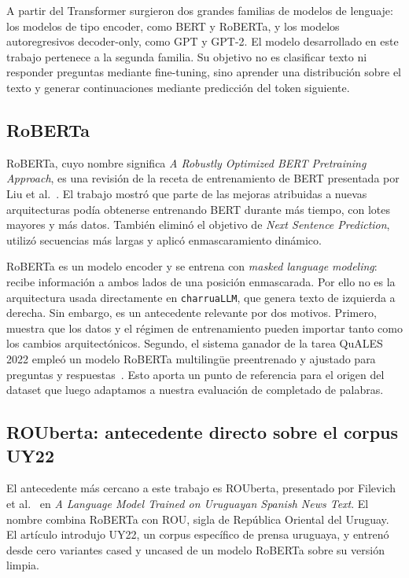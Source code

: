 \documentclass[11pt,a4paper]{article}
\newcommand{\charrua}{\texttt{charruaLLM}}
\begin{document}
A partir del Transformer surgieron dos grandes familias de modelos de lenguaje:
los modelos de tipo encoder, como BERT y RoBERTa, y los modelos autoregresivos
decoder-only, como GPT y GPT-2. El modelo desarrollado en este trabajo pertenece
a la segunda familia. Su objetivo no es clasificar texto ni responder preguntas
mediante fine-tuning, sino aprender una distribución sobre el texto y generar
continuaciones mediante predicción del token siguiente.


\subsection{RoBERTa}

RoBERTa, cuyo nombre significa \emph{A Robustly Optimized BERT Pretraining
Approach}, es una revisión de la receta de entrenamiento de BERT presentada por
Liu et al.~\cite{liu2019}. El trabajo mostró que parte de las mejoras atribuidas
a nuevas arquitecturas podía obtenerse entrenando BERT durante más tiempo, con
lotes mayores y más datos. También eliminó el objetivo de \emph{Next Sentence
Prediction}, utilizó secuencias más largas y aplicó enmascaramiento dinámico.

RoBERTa es un modelo encoder y se entrena con \emph{masked language modeling}:
recibe información a ambos lados de una posición enmascarada. Por ello no es la
arquitectura usada directamente en \charrua, que genera texto de izquierda a
derecha. Sin embargo, es un antecedente relevante por dos motivos. Primero,
muestra que los datos y el régimen de entrenamiento pueden importar tanto como
los cambios arquitectónicos. Segundo, el sistema ganador de la tarea QuALES
2022 empleó un modelo RoBERTa multilingüe preentrenado y ajustado para preguntas
y respuestas~\cite{rosa2022}. Esto aporta un punto de referencia para el origen
del dataset que luego adaptamos a nuestra evaluación de completado de palabras.


\subsection{ROUberta: antecedente directo sobre el corpus UY22}

El antecedente más cercano a este trabajo es ROUberta, presentado por Filevich
et al.~\cite{filevich2024} en \emph{A Language Model Trained on Uruguayan
Spanish News Text}. El nombre combina RoBERTa con ROU, sigla de República
Oriental del Uruguay. El artículo introdujo UY22, un corpus específico de
prensa uruguaya, y entrenó desde cero variantes cased y uncased de un modelo
RoBERTa sobre su versión limpia.
\end{document}
